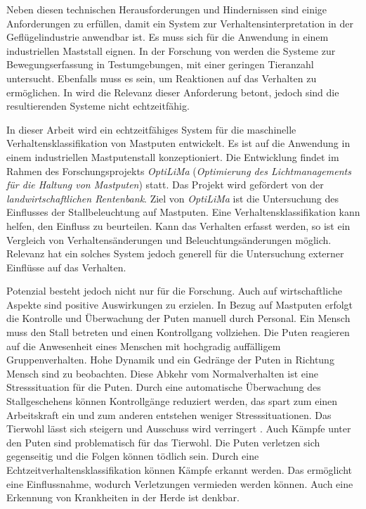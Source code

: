 Neben diesen technischen Herausforderungen und Hindernissen sind einige Anforderungen zu erfüllen, damit ein System zur Verhaltensinterpretation in der Geflügelindustrie anwendbar ist. Es muss sich für die Anwendung in einem industriellen Maststall eignen. In der Forschung von \cite{Fang.2020, Ju.2021} werden die Systeme zur Bewegungserfassung in Testumgebungen, mit einer geringen Tieranzahl untersucht. Ebenfalls muss es  sein, um Reaktionen auf das Verhalten zu ermöglichen. In \cite{Chen.2023, Nasirahmadi.2020} wird die Relevanz dieser Anforderung betont, jedoch sind die resultierenden Systeme nicht echtzeitfähig. \par

In dieser Arbeit wird ein echtzeitfähiges System für die maschinelle Verhaltensklassifikation von Mastputen entwickelt. Es ist auf die Anwendung in einem industriellen Mastputenstall konzeptioniert. Die Entwicklung findet im Rahmen des Forschungsprojekts \textit{\acrshort{OptiLiMa}} (\textit{Optimierung des Lichtmanagements für die Haltung von Mastputen}) statt. Das Projekt wird gefördert von der \textit{landwirtschaftlichen Rentenbank}. Ziel von \textit{\acrshort{OptiLiMa}} ist die Untersuchung des Einflusses der Stallbeleuchtung auf Mastputen. Eine Verhaltensklassifikation kann helfen, den Einfluss zu beurteilen. Kann das Verhalten erfasst werden, so ist ein Vergleich von Verhaltensänderungen und Beleuchtungsänderungen möglich. Relevanz hat ein solches System jedoch generell für die Untersuchung externer Einflüsse auf das Verhalten.\par

Potenzial besteht jedoch nicht nur für die Forschung. Auch auf wirtschaftliche Aspekte sind positive Auswirkungen zu erzielen. In Bezug auf Mastputen erfolgt die Kontrolle und Überwachung der Puten manuell durch Personal. Ein Mensch muss den Stall betreten und einen Kontrollgang vollziehen. Die Puten reagieren auf die Anwesenheit eines Menschen mit hochgradig auffälligem Gruppenverhalten. Hohe Dynamik und ein Gedränge der Puten in Richtung Mensch sind zu beobachten. Diese Abkehr vom Normalverhalten ist eine Stresssituation für die Puten. Durch eine automatische Überwachung des Stallgeschehens können Kontrollgänge reduziert werden, das spart zum einen Arbeitskraft ein und zum anderen entstehen weniger Stresssituationen. Das Tierwohl lässt sich steigern und Ausschuss wird verringert \cite{Chen.2023, Garcia.2020}. Auch Kämpfe unter den Puten sind problematisch für das Tierwohl. Die Puten verletzen sich gegenseitig und die Folgen können tödlich sein. Durch eine Echtzeitverhaltensklassifikation können Kämpfe erkannt werden. Das ermöglicht eine Einflussnahme, wodurch Verletzungen vermieden werden können. Auch eine Erkennung von Krankheiten in der Herde ist denkbar.\par

